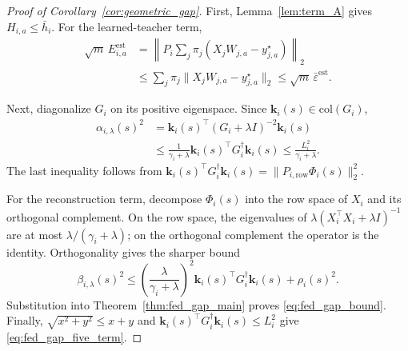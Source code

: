 \documentclass[sigconf,anonymous]{aamas}
\theoremstyle{plain}
\theoremstyle{definition}
\theoremstyle{remark}
\begin{document}
\begin{proof}[Proof of Corollary~\ref{cor:geometric_gap}]
First, Lemma~\ref{lem:term_A} gives $H_{i,a}\le\bar h_i$.
For the learned-teacher term,
\begin{align*}
\sqrt m\,E_{i,a}^{\mathrm{est}}
&=
\left\|
P_i\sum_j\pi_j
(X_jW_{j,a}-y^\star_{j,a})
\right\|_2\\
&\le
\sum_j\pi_j
\|X_jW_{j,a}-y^\star_{j,a}\|_2
\le
\sqrt m\,\bar\varepsilon^{\mathrm{est}}.
\end{align*}

Next, diagonalize $G_i$ on its positive eigenspace.  Since
$\mathbf k_i(s)\in\mathrm{col}(G_i)$,
\begin{align*}
\alpha_{i,\lambda}(s)^2
&=
\mathbf k_i(s)^\top(G_i+\lambda I)^{-2}\mathbf k_i(s)\\
&\le
\frac{1}{\gamma_i+\lambda}
\mathbf k_i(s)^\top G_i^\dagger\mathbf k_i(s)
\le
\frac{L_i^2}{\gamma_i+\lambda}.
\end{align*}
The last inequality follows from
$\mathbf k_i(s)^\top G_i^\dagger\mathbf k_i(s)
=\|P_{i,\mathrm{row}}\Phi_i(s)\|_2^2$.

For the reconstruction term, decompose $\Phi_i(s)$ into the row space
of $X_i$ and its orthogonal complement.  On the row space, the
eigenvalues of
$\lambda(X_i^\top X_i+\lambda I)^{-1}$ are at most
$\lambda/(\gamma_i+\lambda)$; on the orthogonal complement the operator
is the identity.  Orthogonality gives the sharper bound
\[
\beta_{i,\lambda}(s)^2
\le
\left(\frac{\lambda}{\gamma_i+\lambda}\right)^2
\mathbf k_i(s)^\top G_i^\dagger\mathbf k_i(s)
+
\rho_i(s)^2.
\]
Substitution into Theorem~\ref{thm:fed_gap_main} proves
\eqref{eq:fed_gap_bound}.  Finally,
$\sqrt{x^2+y^2}\le x+y$ and
$\mathbf k_i(s)^\top G_i^\dagger\mathbf k_i(s)\le L_i^2$
give \eqref{eq:fed_gap_five_term}.
\end{proof}


\end{document}
